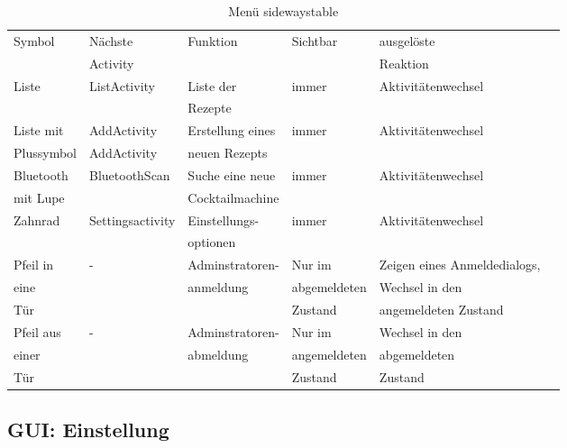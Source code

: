 \begin{table}
	\centering
	\caption{Menü sidewaystable}
	
	\begin{tabular}{|l|l|l|l|l|l|}
		\hline
		Symbol  & Nächste   & Funktion  & Sichtbar  & ausgelöste  \\
		&  Activity  &   &   &  Reaktion \\ \hline
		Liste  & ListActivity  & Liste der    & immer  & Aktivitätenwechsel \\ 
		&    &   Rezepte  &    &   \\ \hline
		Liste mit   & AddActivity  & Erstellung eines  & immer  & Aktivitätenwechsel \\ 
		Plussymbol  & AddActivity  &  neuen Rezepts  &   &  \\ \hline
		Bluetooth   & BluetoothScan  & Suche eine neue   & immer  & Aktivitätenwechsel \\
		mit Lupe  &   &  Cocktailmachine  &    &   \\ \hline
		Zahnrad  & Settingsactivity  & Einstellungs-  & immer  & Aktivitätenwechsel \\   &    & optionen   &    &   \\ \hline
		Pfeil in   & -  & Adminstratoren-  & Nur im   & Zeigen eines Anmeldedialogs, \\
		eine   &  &anmeldung   & abgemeldeten   & Wechsel in den  \\ 
		Tür   &  &    &  Zustand  & angemeldeten Zustand \\ \hline
		Pfeil aus   & -  & Adminstratoren-  & Nur im  & Wechsel in den \\  
		einer   &   &abmeldung    &  angemeldeten   & abgemeldeten  \\
		Tür  &   &    &   Zustand  &  Zustand \\ \hline
	\end{tabular}
	
\end{table}
\newpage

\subsection{GUI: Einstellung}

